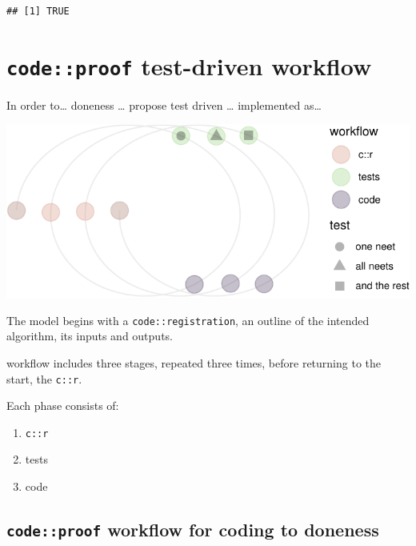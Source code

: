 \documentclass[
]{article}
\providecommand{\tightlist}{%
  \setlength{\itemsep}{0pt}\setlength{\parskip}{0pt}}
\begin{document}
\begin{verbatim}
## [1] TRUE
\end{verbatim}

\hypertarget{codeproof-test-driven-workflow}{%
\section{\texorpdfstring{\texttt{code::proof} test-driven
workflow}{code::proof test-driven workflow}}\label{codeproof-test-driven-workflow}}

In order to\ldots{} doneness \ldots{} propose test driven \ldots{}
implemented as\ldots{}

\begin{center}\includegraphics{when-is-done-done_files/figure-latex/unnamed-chunk-2-1} \end{center}

The model begins with a \texttt{code::registration}, an outline of the
intended algorithm, its inputs and outputs.

workflow includes three stages, repeated three times, before returning
to the start, the \texttt{c::r}.

Each phase consists of:

\begin{enumerate}
\def\labelenumi{\arabic{enumi}.}
\tightlist
\item
  \texttt{c::r}
\item
  tests
\item
  code
\end{enumerate}

\hypertarget{codeproof-workflow-for-coding-to-doneness}{%
\subsection{\texorpdfstring{\texttt{code::proof} workflow for coding to
doneness}{code::proof workflow for coding to doneness}}\label{codeproof-workflow-for-coding-to-doneness}}
\end{document}

